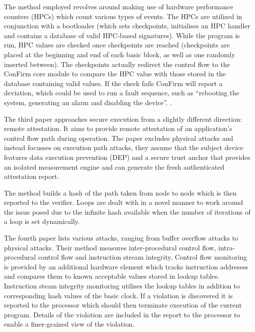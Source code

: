 The method employed revolves around making use of hardware performance counters (HPCs) which count various types of events. The HPCs are utilized in conjunction with a bootloader (which sets checkpoints, initialises an HPC handler and contains a database of valid HPC-based signatures). While the program is run, HPC values are checked once checkpoints are reached (checkpoints are placed at the beginning and end of each basic block, as well as one randomly inserted between). The checkpoints actually redirect the control flow to the ConFirm core module to compare the HPC value with those stored in the database containing valid values. If the check fails ConFirm will report a deviation, which could be used to run a fault sequence, such as ``rebooting the system, generating an alarm and disabling the device''. .

The third paper \cite{Abera2016} approaches secure execution from a slightly different direction: remote attestation. It aims to provide remote attestation of an application's control flow path during operation. The paper excludes physical attacks and instead focusses on execution path attacks, they assume that the subject  device features data  execution prevention (DEP) and a secure trust anchor that provides an isolated measurement engine and can generate the fresh authenticated attestation report.

The method builds a hash of the path taken from node to node which is then reported to the verifier.  Loops are dealt with in a novel manner to work around the issue posed due to the infinite hash available when the number of iterations of a loop is set dynamically.

The fourth paper \cite{Arora2006} lists various attacks, ranging from buffer overflow attacks to physical attacks. Their method measures inter-procedural control flow, intra-procedural control flow and instruction stream integrity. Control flow monitoring is provided by an additional hardware element which tracks instruction addresses and compares them to known acceptable values stored in lookup tables. Instruction steam integrity monitoring utilises the lookup tables in addition to corresponding hash values of the basic clock. If a violation is discovered it is reported to the processor which should then terminate execution of the current program. Details of the violation are included in the report to the processor to enable a finer-grained view of the violation.

